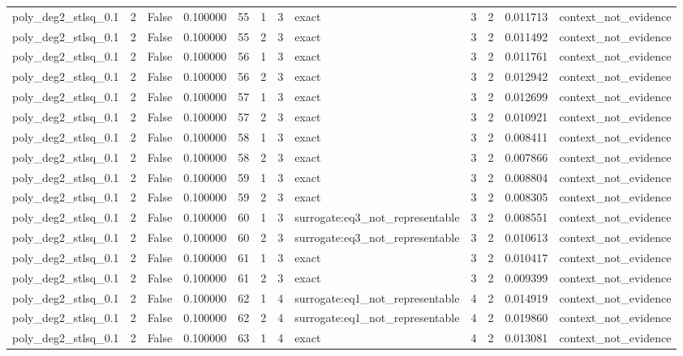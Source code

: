 \begin{tabular}{lrrrrrrlrrrl}
poly\_deg2\_stlsq\_0.1 & 2 & False & 0.100000 & 55 & 1 & 3 & exact & 3 & 2 & 0.011713 & context\_not\_evidence \\
poly\_deg2\_stlsq\_0.1 & 2 & False & 0.100000 & 55 & 2 & 3 & exact & 3 & 2 & 0.011492 & context\_not\_evidence \\
poly\_deg2\_stlsq\_0.1 & 2 & False & 0.100000 & 56 & 1 & 3 & exact & 3 & 2 & 0.011761 & context\_not\_evidence \\
poly\_deg2\_stlsq\_0.1 & 2 & False & 0.100000 & 56 & 2 & 3 & exact & 3 & 2 & 0.012942 & context\_not\_evidence \\
poly\_deg2\_stlsq\_0.1 & 2 & False & 0.100000 & 57 & 1 & 3 & exact & 3 & 2 & 0.012699 & context\_not\_evidence \\
poly\_deg2\_stlsq\_0.1 & 2 & False & 0.100000 & 57 & 2 & 3 & exact & 3 & 2 & 0.010921 & context\_not\_evidence \\
poly\_deg2\_stlsq\_0.1 & 2 & False & 0.100000 & 58 & 1 & 3 & exact & 3 & 2 & 0.008411 & context\_not\_evidence \\
poly\_deg2\_stlsq\_0.1 & 2 & False & 0.100000 & 58 & 2 & 3 & exact & 3 & 2 & 0.007866 & context\_not\_evidence \\
poly\_deg2\_stlsq\_0.1 & 2 & False & 0.100000 & 59 & 1 & 3 & exact & 3 & 2 & 0.008804 & context\_not\_evidence \\
poly\_deg2\_stlsq\_0.1 & 2 & False & 0.100000 & 59 & 2 & 3 & exact & 3 & 2 & 0.008305 & context\_not\_evidence \\
poly\_deg2\_stlsq\_0.1 & 2 & False & 0.100000 & 60 & 1 & 3 & surrogate:eq3\_not\_representable & 3 & 2 & 0.008551 & context\_not\_evidence \\
poly\_deg2\_stlsq\_0.1 & 2 & False & 0.100000 & 60 & 2 & 3 & surrogate:eq3\_not\_representable & 3 & 2 & 0.010613 & context\_not\_evidence \\
poly\_deg2\_stlsq\_0.1 & 2 & False & 0.100000 & 61 & 1 & 3 & exact & 3 & 2 & 0.010417 & context\_not\_evidence \\
poly\_deg2\_stlsq\_0.1 & 2 & False & 0.100000 & 61 & 2 & 3 & exact & 3 & 2 & 0.009399 & context\_not\_evidence \\
poly\_deg2\_stlsq\_0.1 & 2 & False & 0.100000 & 62 & 1 & 4 & surrogate:eq1\_not\_representable & 4 & 2 & 0.014919 & context\_not\_evidence \\
poly\_deg2\_stlsq\_0.1 & 2 & False & 0.100000 & 62 & 2 & 4 & surrogate:eq1\_not\_representable & 4 & 2 & 0.019860 & context\_not\_evidence \\
poly\_deg2\_stlsq\_0.1 & 2 & False & 0.100000 & 63 & 1 & 4 & exact & 4 & 2 & 0.013081 & context\_not\_evidence \\

\end{tabular}
